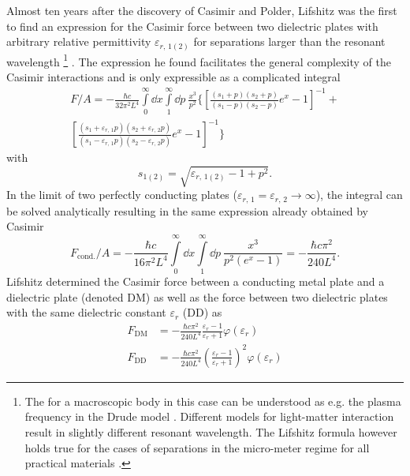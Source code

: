 Almost ten years after the discovery of Casimir and Polder, Lifshitz was the first to find an expression for the Casimir force between two dielectric plates with arbitrary relative permittivity $\varepsilon_{r,\,1(2)}$ for separations larger than the resonant wavelength \footnote{The  for a macroscopic body in this case can be understood as e.g. the plasma frequency in the Drude model \cite{Ford_1998}. Different models for light-matter interaction result in slightly different resonant wavelength. The Lifshitz formula however holds true for the cases of separations in the micro-meter regime for all practical materials \cite{Kamp_2020}.} \cite{Lifshitz_1956}.
The expression he found facilitates the general complexity of the Casimir interactions and is only expressible as a complicated integral \cite{Lifshitz_1956}
\begin{multline}\label{eq:3:lifshitz-general-integral}
  F/A = -\frac{\hbar c}{32 \pi^2 L^4} \int\limits_0^\infty \dd x \int\limits_1^\infty \dd p \ \frac{x^3}{p^2}\biggl\{ \left[ \frac{(s_1+p)(s_2+p)}{(s_1-p)(s_2-p)} e^x - 1 \right]^{-1} + \\
  \left[ \frac{(s_1+ \varepsilon_{r,\,1} p)(s_2 + \varepsilon_{r,\,2} p)}{(s_1 - \varepsilon_{r,\,1} p)(s_2 - \varepsilon_{r,\,2} p)} e^x - 1 \right]^{-1} \biggr\}
\end{multline}
with
\begin{equation*}
  s_{1(2)} = \sqrt{\varepsilon_{r,\,1(2)} - 1 + p^2} .
\end{equation*}
In the limit of two perfectly conducting plates ($\varepsilon_{r,\,1} = \varepsilon_{r,\,2} \rightarrow \infty$), the integral can be solved analytically resulting in the same expression already obtained by Casimir
\begin{equation}
  F_\mathrm{cond.}/A = -\frac{\hbar c}{16 \pi^2 L^4} \int\limits_0^\infty \dd x \int\limits_1^\infty \dd p \ \frac{x^3}{p^2 (e^x - 1)} = -\frac{\hbar c \pi^2}{240 L^4} .
\end{equation}
Lifshitz determined the Casimir force between a conducting metal plate and a dielectric plate (denoted $\mathrm{DM}$) as well as the force between two dielectric plates with the same dielectric constant $\varepsilon_r$ ($\mathrm{DD}$) as
\begin{align} \label{eq:3:casimir-pp-F-DM-lifshitz}
  F_\mathrm{DM} &= -\frac{\hbar c \pi^2}{240 L^4} \frac{\varepsilon_r - 1}{\varepsilon_r + 1} \varphi(\varepsilon_r) \\
  F_\mathrm{DD} &= -\frac{\hbar c \pi^2}{240 L^4} \left( \frac{\varepsilon_r - 1}{\varepsilon_r + 1} \right)^2 \varphi(\varepsilon_r)\label{eq:3:casimir-pp-F-DD-lifshitz}
\end{align}
